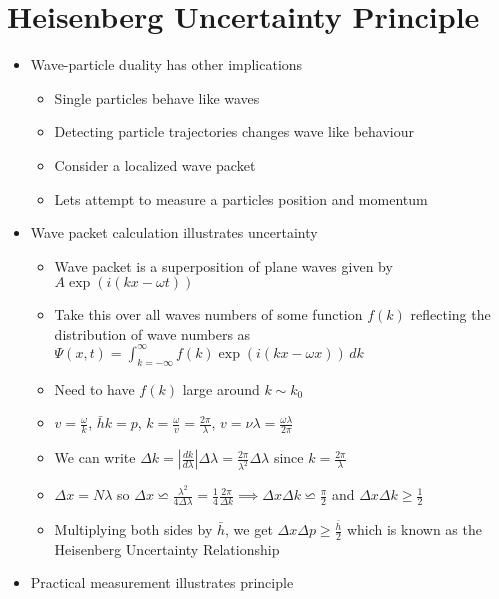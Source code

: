 \documentclass[12pt]{article}
\begin{document}
\section{Heisenberg Uncertainty Principle}

\begin{itemize}
    \item Wave-particle duality has other implications \begin{itemize}
        \item Single particles behave like waves
        \item Detecting particle trajectories changes wave like behaviour
        \item Consider a localized wave packet
        \item Lets attempt to measure a particles position and momentum
    \end{itemize}
    \item Wave packet calculation illustrates uncertainty \begin{itemize}
        \item Wave packet is a superposition of plane waves given by $A \exp (i(kx - \omega t))$
        \item Take this over all waves numbers of some function $f(k)$ reflecting the distribution of wave numbers as $\varPsi (x,t) = \int_{k = -\infty}^{\infty} f(k) \exp (i(kx-\omega x)) \, dk$
        \item Need to have $f(k)$ large around $k \sim k_0$
        \item $v = \frac{\omega}{k}$, $\bar{h}k = p$, $k = \frac{\omega}{v} = \frac{2 \pi}{\lambda}$, $v = \nu \lambda = \frac{\omega \lambda}{2 \pi}$
        \item We can write $\Delta k = |\frac{dk}{d \lambda} | \Delta \lambda = \frac{2 \pi}{\lambda ^2} \Delta \lambda$ since $k = \frac{2 \pi}{\lambda}$
        \item $\Delta x = N \lambda$ so $\Delta x \backsimeq \frac{\lambda ^2}{4 \Delta \lambda} = \frac{1}{4} \frac{2 \pi}{\Delta k} \implies \Delta x \Delta k \backsimeq \frac{\pi}{2}$ and $\Delta x \Delta k \geq \frac{1}{2}$
        \item Multiplying both sides by $\bar{h}$, we get $\Delta x \Delta p \geq \frac{\bar{h}}{2}$ which is known as the Heisenberg Uncertainty Relationship
    \end{itemize}
    \item Practical measurement illustrates principle \begin{itemize}

\end{itemize}
\end{itemize}
\end{document}
